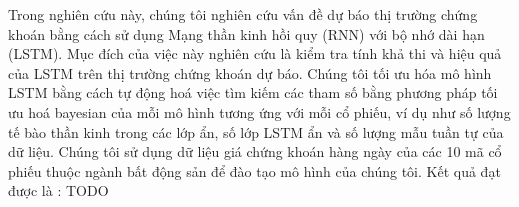 Trong nghiên cứu này, chúng tôi nghiên cứu vấn đề dự báo thị trường chứng khoán bằng cách sử dụng
Mạng thần kinh hồi quy (RNN) với bộ nhớ dài hạn (LSTM). Mục đích của việc này
nghiên cứu là kiểm tra tính khả thi và hiệu quả của LSTM trên thị trường chứng khoán
dự báo. Chúng tôi tối ưu hóa mô hình LSTM bằng cách tự động hoá việc tìm kiếm các tham số bằng phương pháp tối ưu hoá bayesian của mỗi mô hình tương ứng với mỗi cổ phiếu, ví dụ như số lượng tế bào thần kinh trong các lớp ẩn, số lớp LSTM ẩn và số lượng mẫu tuần tự của dữ liệu. Chúng tôi sử dụng dữ liệu giá chứng khoán hàng ngày của các 10 mã cổ phiếu thuộc ngành bất động sản để đào tạo mô hình của chúng tôi. Kết quả đạt được là : TODO